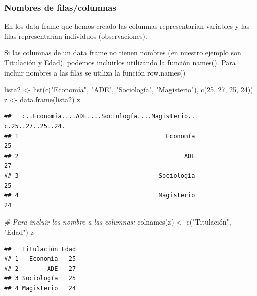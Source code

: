 \documentclass[
]{book}
\newenvironment{Shaded}{\begin{snugshade}}{\end{snugshade}}
\newcommand{\CommentTok}[1]{\textcolor[rgb]{0.56,0.35,0.01}{\textit{#1}}}
\newcommand{\DecValTok}[1]{\textcolor[rgb]{0.00,0.00,0.81}{#1}}
\newcommand{\FunctionTok}[1]{\textcolor[rgb]{0.00,0.00,0.00}{#1}}
\newcommand{\NormalTok}[1]{#1}
\newcommand{\OtherTok}[1]{\textcolor[rgb]{0.56,0.35,0.01}{#1}}
\newcommand{\StringTok}[1]{\textcolor[rgb]{0.31,0.60,0.02}{#1}}
\begin{document}
\hypertarget{nombres-de-filascolumnas}{%
\subsubsection{Nombres de filas/columnas}\label{nombres-de-filascolumnas}}

En los data frame que hemos creado las columnas representarían variables y las filas representarían individuos (observaciones).

Si las columnas de un data frame no tienen nombres (en nuestro ejemplo son Titulación y Edad), podemos incluirlos utilizando la función names(). Para incluir nombres a las filas se utiliza la función row.names()

\begin{Shaded}
\begin{Highlighting}[]
\NormalTok{lista2 }\OtherTok{\textless{}{-}} \FunctionTok{list}\NormalTok{(}\FunctionTok{c}\NormalTok{(}\StringTok{"Economía"}\NormalTok{, }\StringTok{"ADE"}\NormalTok{, }\StringTok{"Sociología"}\NormalTok{, }\StringTok{"Magisterio"}\NormalTok{), }\FunctionTok{c}\NormalTok{(}\DecValTok{25}\NormalTok{, }\DecValTok{27}\NormalTok{, }\DecValTok{25}\NormalTok{, }\DecValTok{24}\NormalTok{))}
\NormalTok{z }\OtherTok{\textless{}{-}} \FunctionTok{data.frame}\NormalTok{(lista2)}
\NormalTok{z}
\end{Highlighting}
\end{Shaded}

\begin{verbatim}
##   c..Economía....ADE....Sociología....Magisterio.. c.25..27..25..24.
## 1                                         Economía                25
## 2                                              ADE                27
## 3                                       Sociología                25
## 4                                       Magisterio                24
\end{verbatim}

\begin{Shaded}
\begin{Highlighting}[]
\CommentTok{\# Para incluir los nombre a las columnas:}
\FunctionTok{colnames}\NormalTok{(z) }\OtherTok{\textless{}{-}} \FunctionTok{c}\NormalTok{(}\StringTok{"Titulación"}\NormalTok{, }\StringTok{"Edad"}\NormalTok{)}
\NormalTok{z}
\end{Highlighting}
\end{Shaded}

\begin{verbatim}
##   Titulación Edad
## 1   Economía   25
## 2        ADE   27
## 3 Sociología   25
## 4 Magisterio   24
\end{verbatim}
\end{document}
